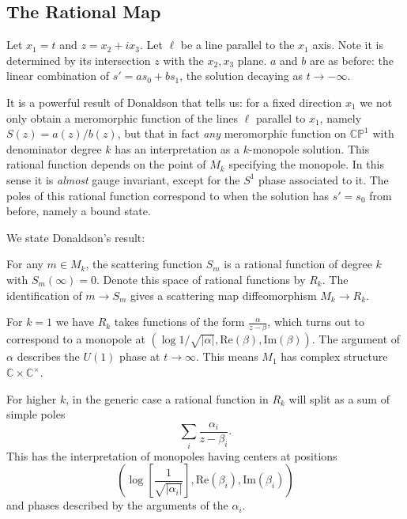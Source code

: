 	
	\subsection{The Rational Map}
	Let $x_1 = t$ and $z = x_2 + i x_3$. Let $\ell$ be a line parallel to the $x_1$ axis. Note it is determined by its intersection $z$ with the $x_2, x_3$ plane. $a$ and $b$ are as before: the linear combination of $s' = a s_0 + b s_1$, the solution decaying as $t \to -\infty$.
	
	It is a powerful result of Donaldson \cite{donaldson1984nahm} that tells us: for a fixed direction $x_1$ we not only obtain a meromorphic function of the lines $\ell$ parallel to $x_1$, namely $S(z) = a(z)/b(z)$, but that in fact \emph{any} meromorphic function on $\mathbb{CP}^1$ with denominator degree $k$ has an interpretation as a $k$-monopole solution. This rational function depends on the point of $M_k$ specifying the monopole. In this sense it is \emph{almost} gauge invariant, except for the $S^1$ phase associated to it. The poles of this rational function correspond to when the solution has $s' = s_0$ from before, namely a bound state. 
	
	We state Donaldson's result:
	\begin{theorem}[Donaldson]
		For any $m \in M_k$, the scattering function $S_m$ is a rational function of degree $k$ with $S_m(\infty) = 0$. Denote this space of rational functions by $R_k$. The identification of $m \to S_m$ gives a scattering map diffeomorphism $M_k \to R_k$.
	\end{theorem}

	\begin{eg}
		For $k=1$ we have $R_k$ takes functions of the form $\frac{\alpha}{z-\beta}$, which turns out to correspond to a monopole at $(\log{1/\sqrt{|\alpha|}}, \mathrm{Re}(\beta), \mathrm{Im}(\beta))$. The argument of $\alpha$ describes the $U(1)$ phase at $t \to \infty$. This means $M_1$ has complex structure $\mathbb C \times \mathbb C^\times$.
	\end{eg}
	\begin{eg}
		For higher $k$, in the generic case a rational function in $R_k$ will split as a sum of simple poles
		$$\sum_{i} \frac{\alpha_i}{z-\beta_i}.$$
		This has the interpretation of monopoles having centers at positions
		\[
			\left(\log \left[ \frac{1}{\sqrt{|\alpha_i|}} \right], \mathrm{Re}\left(\beta_i\right), \mathrm{Im}\left(\beta_i\right) \right)
		\]
		 and phases described by the arguments of the $\alpha_i$.
	\end{eg}
	
